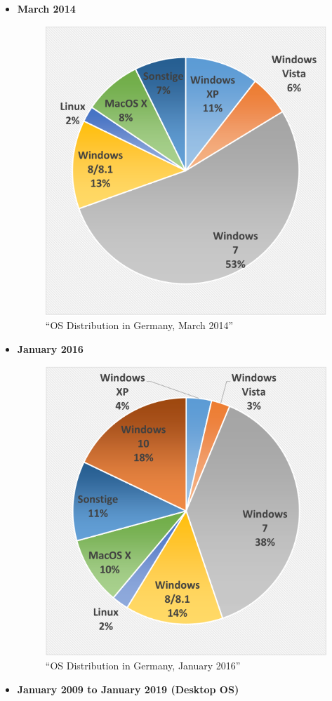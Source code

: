 \documentclass[
]{article}
\begin{document}
\begin{itemize}
\item
  \textbf{March 2014}

  \begin{figure}
  \centering
  \includegraphics{../images/os_dist_g_2014.png}
  \caption{``OS Distribution in Germany, March 2014''}
  \end{figure}
\item
  \textbf{January 2016}

  \begin{figure}
  \centering
  \includegraphics{../images/os_dist_g_2016.png}
  \caption{``OS Distribution in Germany, January 2016''}
  \end{figure}
\item
  \textbf{January 2009 to January 2019 (Desktop OS)}


\end{itemize}
\end{document}
